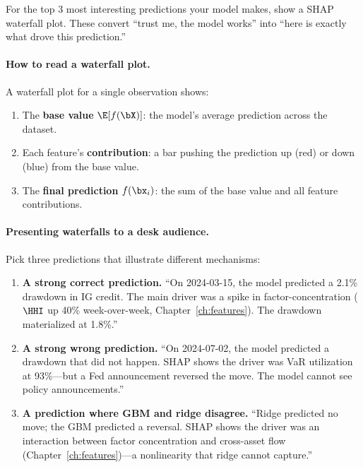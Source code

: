 For the top 3 most interesting predictions your model makes, show a SHAP
waterfall plot.  These convert ``trust me, the model works'' into ``here
is exactly what drove this prediction.''

\paragraph{How to read a waterfall plot.}  A waterfall plot for a single
observation shows:

\begin{enumerate}[leftmargin=1.5em]
  \item The \textbf{base value} $\E[f(\bX)]$: the model's average
    prediction across the dataset.
  \item Each feature's \textbf{contribution}: a bar pushing the prediction
    up (red) or down (blue) from the base value.
  \item The \textbf{final prediction} $f(\bx_i)$: the sum of the base
    value and all feature contributions.
\end{enumerate}

\paragraph{Presenting waterfalls to a desk audience.}
Pick three predictions that illustrate different mechanisms:

\begin{enumerate}[leftmargin=1.5em]
  \item \textbf{A strong correct prediction.}  ``On 2024-03-15, the model
    predicted a 2.1\% drawdown in IG credit.  The main driver was a spike
    in factor-concentration ($\HHI$ up 40\% week-over-week,
    Chapter~\ref{ch:features}).  The drawdown materialized at 1.8\%.''
  \item \textbf{A strong wrong prediction.}  ``On 2024-07-02, the model
    predicted a drawdown that did not happen.  SHAP shows the driver was
    VaR utilization at 93\%---but a Fed announcement reversed the move.
    The model cannot see policy announcements.''
  \item \textbf{A prediction where GBM and ridge disagree.}  ``Ridge
    predicted no move; the GBM predicted a reversal.  SHAP shows the
    driver was an interaction between factor concentration and cross-asset
    flow (Chapter~\ref{ch:features})---a nonlinearity that ridge cannot
    capture.''
\end{enumerate}

